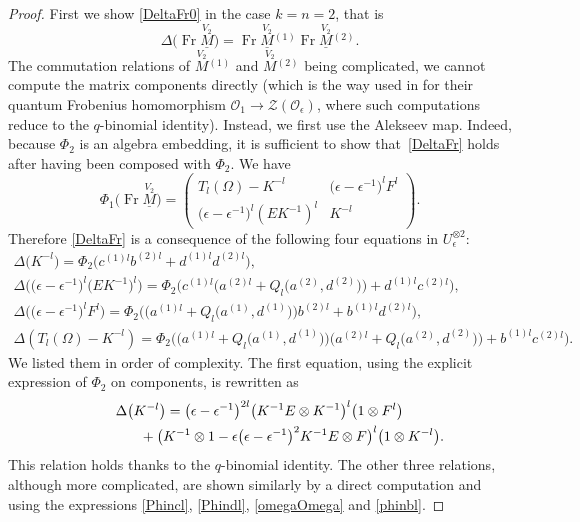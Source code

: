 \documentclass[pdftex]{sigma}%
\numberwithin{equation}{section}
\numberwithin{figure}{section}
\newcommand{\e}{\epsilon}
\newcommand{\ra}{\rightarrow}
\begin{document}
\begin{proof} First we show \eqref{DeltaFr0} in the case $k=n=2$, that is
\begin{equation}\label{DeltaFr}
\Delta\big(\!\operatorname{Fr}\underline{\stackrel{V_2}{M}}\big)
=\operatorname{Fr}\underline{\stackrel{V_2}{M}}{}^{(1)} \operatorname{Fr}\underline{\stackrel{V_2}{M}}{}^{(2)}.
\end{equation}
The commutation relations of $\stackrel{V_2}{M}{}^{\!\!\!(1)}$ and $\stackrel{V_2}{M}{}^{\!\!\!(2)}$ being complicated, we cannot compute the matrix components directly (which is the way used in \cite{PW} for their quantum Frobenius homomorphism $\mathcal{O}_1 \ra \mathcal{Z}(\mathcal{O}_\e)$, where such computations reduce to the $q$-binomial identity). Instead, we first use the Alekseev map. Indeed, because $\Phi_2$ is an algebra embedding, it is sufficient to show that~\eqref{DeltaFr} holds after having been composed with $\Phi_2$. We have
\[
\Phi_1\big(\!\operatorname{Fr}\underline{\stackrel{V_2}{M}}\big)
= \begin{pmatrix} T_l(\Omega)- K^{-l} & \big(\epsilon-\epsilon^{-1}\big)^l F^l\\[.5ex]
 \big(\epsilon-\epsilon^{-1}\big)^l (EK^{-1})^l& K^{-l}\end{pmatrix}\!.
 \]
Therefore \eqref{DeltaFr} is a consequence of the following four equations in $U_\epsilon^{\otimes 2}$:
\begin{gather*}
\Delta\big(K^{-l}\big)=\Phi_2\big(c^{(1)l}b^{(2)l}+d^{(1)l}d^{(2)l}\big),
\\
\Delta\big(\big(\epsilon-\epsilon^{-1}\big)^l \big(EK^{-1}\big)^l\big)=\Phi_2\big(c^{(1)l}\big(a^{(2)l}+Q_l\big(a^{(2)},d^{(2)} \big)\big)+d^{(1)l}c^{(2)l}\big),
\\
\Delta\big(\big(\epsilon-\epsilon^{-1}\big)^l F^l\big)=\Phi_2\big(\big(a^{(1)l}+Q_l\big(a^{(1)},d^{(1)} \big)\big) b^{(2)l}+b^{(1)l}d^{(2)l}\big),
\\
\Delta(T_l(\Omega)- K^{-l})=\Phi_2\big(\big(a^{(1)l}+Q_l\big(a^{(1)},d^{(1)} \big)\big) \big(a^{(2)l}+Q_l\big(a^{(2)},d^{(2)}\big)\big)+b^{(1)l}c^{(2)l}\big).
\end{gather*}
We listed them in order of complexity. The first equation, using the explicit expression of $\Phi_2$ on components, is rewritten as
\begin{gather*}
\Delta\big(K^{-l}\big)=\big(\epsilon-\epsilon^{-1}\big)^{2l}\big(K^{-1}E\otimes K^{-1} \big)^l \big(1\otimes F^l\big)
\\ \hphantom{\Delta\big(K^{-l}\big)=}
{}+ \big(K^{-1}\otimes 1- \epsilon\big(\epsilon-\epsilon^{-1}\big)^2 K^{-1}E\otimes F\big)^l \big(1\otimes K^{-l}\big).
\end{gather*}
This relation holds thanks to the $q$-binomial identity. The other three relations, although more complicated, are shown similarly by a direct computation and using the expressions \eqref{Phincl}, \eqref{Phindl}, \eqref{omegaOmega} and \eqref{phinbl}.


\end{proof}
\end{document}
